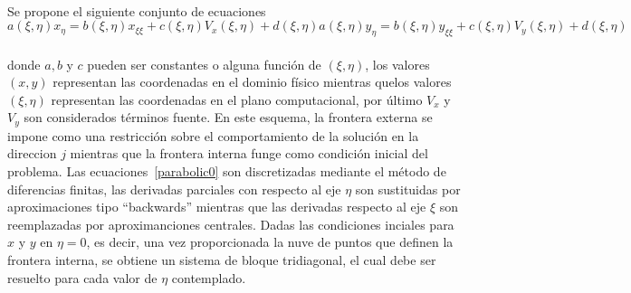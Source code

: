 \documentclass[letterpaper, openright, 12pt]{book}
\begin{document}
    \paragraph*{}
        Se propone el siguiente conjunto de ecuaciones
        \begin{subequations}
            \begin{equation}
                a(\xi, \eta) x_\eta = b(\xi, \eta)x_{\xi\xi} + c(\xi, \eta)V_x(\xi, \eta) + d(\xi, \eta)
            \end{equation}
            \begin{equation}
                a(\xi, \eta) y_\eta = b(\xi, \eta)y_{\xi\xi} + c(\xi, \eta)V_y(\xi, \eta) + d(\xi, \eta)
            \end{equation}
            \label{parabolic0}
        \end{subequations}\\
        donde $a, b$ y $c$ pueden ser constantes o alguna función de
        $(\xi,\eta)$, los valores $(x, y)$ representan las coordenadas en el
        dominio físico mientras quelos valores $(\xi, \eta)$ representan las
        coordenadas en el plano computacional, por último $V_x$ y $V_y$ son
        considerados términos fuente. En este esquema, la frontera externa se
        impone como una restricción sobre el comportamiento de la solución en la
        direccion $j$ mientras que la frontera interna funge como condición
        inicial del problema. Las ecuaciones~\ref{parabolic0} son discretizadas
        mediante el método de diferencias finitas, las derivadas parciales con
        respecto al eje $\eta$ son sustituidas por aproximaciones tipo
        ``backwards'' mientras que las derivadas respecto al eje $\xi$ son
        reemplazadas por aproximanciones centrales. Dadas las condiciones
        inciales para $x$  y $y$ en $\eta = 0$, es decir, una vez proporcionada
        la nuve de puntos que definen la frontera interna, se obtiene un sistema
        de bloque tridiagonal, el cual debe ser resuelto para cada valor de
        $\eta$ contemplado.
\end{document}
